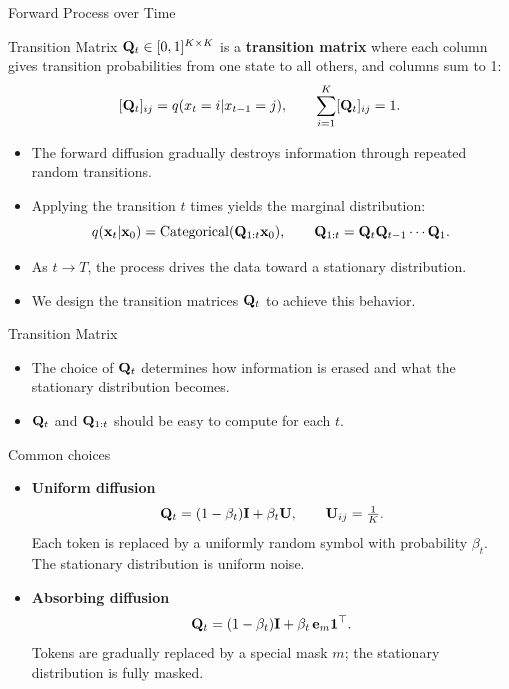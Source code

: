 \documentclass{beamer}
\renewcommand{\eqpause}{}
\begin{document}
\begin{frame}{Forward Process over Time}
	\begin{block}{Transition Matrix}
		$\mathbf{Q}_t \in [0,1]^{K \times K}$ is a \textbf{transition matrix} where each column gives transition probabilities from one state to all others, and columns sum to 1:
		\vspace{-0.5cm}
		\[
			[\mathbf{Q}_t]_{ij} = q(x_t = i | x_{t-1} = j),
			\qquad
			\sum_{i=1}^K [\mathbf{Q}_t]_{ij} = 1.
		\]
		\vspace{-0.7cm}
	\end{block}
	\eqpause
	\begin{itemize}
		\item The forward diffusion gradually destroys information through repeated random transitions.
		\eqpause
		\item Applying the transition $t$ times yields the marginal distribution:
			\[
				q(\mathbf{x}_t|\mathbf{x}_0) = \mathrm{Categorical}(\mathbf{Q}_{1:t}\mathbf{x}_0),
				\qquad
				\mathbf{Q}_{1:t} = \mathbf{Q}_t \mathbf{Q}_{t-1}\cdots\mathbf{Q}_1.
			\]
		\eqpause
		\vspace{-0.7cm}
		\item As $t \to T$, the process drives the data toward a stationary distribution.
		\eqpause
		\item We design the transition matrices $\mathbf{Q}_t$ to achieve this behavior.
	\end{itemize}
\end{frame}
\begin{frame}{Transition Matrix}
	\begin{itemize}
		\item The choice of $\mathbf{Q}_t$ determines how information is erased and what the stationary distribution becomes.
		\eqpause
		\item $\mathbf{Q}_t$ and $\mathbf{Q}_{1:t}$ should be easy to compute for each $t$.
	\end{itemize}
	\eqpause
	\begin{block}{Common choices}
		\begin{itemize}
			\item \textbf{Uniform diffusion}
			\[
				\mathbf{Q}_t = (1 - \beta_t) \mathbf{I} + \beta_t \mathbf{U},
				\qquad
				\mathbf{U}_{ij} = \tfrac{1}{K}.
			\]
			Each token is replaced by a uniformly random symbol with probability $\beta_t$.
			The stationary distribution is uniform noise.
			\eqpause
			\item \textbf{Absorbing diffusion}
			\[
				\mathbf{Q}_t = (1-\beta_t)\mathbf{I} + \beta_t\, \mathbf{e}_m \mathbf{1}^\top.
			\]
			Tokens are gradually replaced by a special mask $m$;
			the stationary distribution is fully masked.
		\end{itemize}
	\end{block}
\end{frame}
\end{document}
